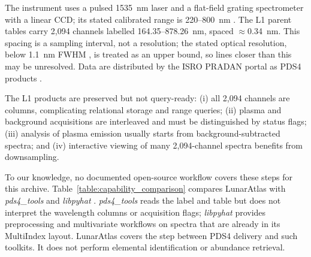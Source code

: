 \documentclass[final,5p,twocolumn,a4paper]{elsarticle}
\begin{document}
The instrument uses a pulsed 1535~nm laser and a flat-field grating spectrometer with a linear CCD; its stated calibrated range is 220--800~nm \cite{sridhar2025libs}. The L1 parent tables carry 2,094 channels labelled 164.35--878.26~nm, spaced $\approx$0.34~nm. This spacing is a sampling interval, not a resolution; the stated optical resolution, below 1.1~nm FWHM \cite{sridhar2025libs}, is treated as an upper bound, so lines closer than this may be unresolved. Data are distributed by the ISRO PRADAN portal as PDS4 products \cite{isro_chandrayaan3_libs, pds4_standard}.

The L1 products are preserved but not query-ready: (i) all 2,094 channels are columns, complicating relational storage and range queries; (ii) plasma and background acquisitions are interleaved and must be distinguished by status flags; (iii) analysis of plasma emission usually starts from background-subtracted spectra; and (iv) interactive viewing of many 2,094-channel spectra benefits from downsampling.

To our knowledge, no documented open-source workflow covers these steps for this archive. Table~\ref{table:capability_comparison} compares LunarAtlas with \emph{pds4\_tools} \cite{pds4_tools_ref} and \emph{libpyhat} \cite{anderson2019libpyhat}. \emph{pds4\_tools} reads the label and table but does not interpret the wavelength columns or acquisition flags; \emph{libpyhat} provides preprocessing and multivariate workflows on spectra that are already in its MultiIndex layout. LunarAtlas covers the step between PDS4 delivery and such toolkits. It does not perform elemental identification or abundance retrieval.
\end{document}

